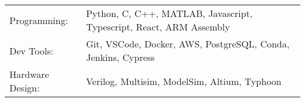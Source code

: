 \begin{tabularx}{\linewidth}{@{}l X@{}}
Programming: &  \normalsize{Python, C, C++, MATLAB, Javascript, Typescript, React, ARM Assembly}\\
Dev Tools:  &  \normalsize{Git, VSCode, Docker, AWS, PostgreSQL, Conda, Jenkins, Cypress}\\
Hardware Design: & \normalsize{Verilog, Multisim, ModelSim, Altium, Typhoon} \\
\end{tabularx}